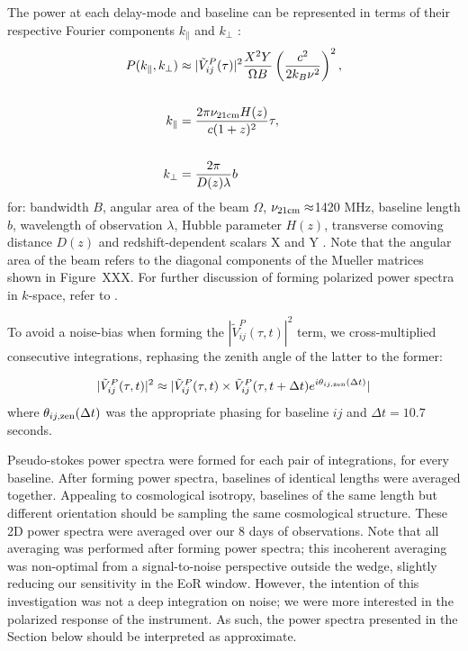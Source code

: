 The power at each delay-mode and baseline can be represented in terms of their respective Fourier components $k_{\parallel}$ and $k_{\perp}$ \citep{Parsons.12a, Nithya.15b}:
\begin{align*}
P(k_{\parallel},k_{\perp}) &\approx | \tilde{V}_{ij}^{P}(\tau) |^2 \frac{X^2 Y}{\Omega B} \left(\frac{c^2}{2k_B\nu^2}\right)^2 , \\\\
k_{\parallel} &= \frac{2\pi \nu_{\rm 21cm} H(z) %
}{c (1+z)^2}\tau, \\\\
k_{\perp} &= \frac{2\pi}{D(z) \lambda} b\\
\end{align*}
for: bandwidth $B$, angular area of the beam $\Omega$, $\nu_{\rm 21cm}\approx$1420 MHz, baseline length $b$, wavelength of observation $\lambda$, Hubble parameter $H(z)$, transverse comoving distance $D(z)$ and redshift-dependent scalars X and Y \citep{Parsons.12b}. Note that the angular area of the beam refers to the diagonal components of the Mueller matrices shown in Figure~XXX. For further discussion of forming polarized power spectra in $k$-space, refer to \cite{Nunhokee.17}.

To avoid a noise-bias when forming the $ |\tilde{V}_{ij}^{P}(\tau, t) |^2$ term, we cross-multiplied consecutive integrations, rephasing the zenith angle of the latter to the former:

\begin{equation}
 | \tilde{V}_{ij}^{P}(\tau, t) |^2 \approx | \tilde{V}_{ij}^{P}(\tau, t) \times \tilde{V}_{ij}^{P}(\tau, t+\Delta t)e^{i\theta_{ij,\rm zen}(\Delta t)}|
\end{equation}
where $\theta_{ij,\rm zen}(\Delta t)$ was the appropriate phasing for baseline $ij$ and $\Delta t = 10.7$ seconds.

Pseudo-stokes power spectra were formed for each pair of integrations, for every baseline. After forming power spectra, baselines of identical lengths were averaged together. Appealing to cosmological isotropy, baselines of the same length but different orientation should be sampling the same cosmological structure. These 2D power spectra were averaged over our 8 days of observations. Note that all averaging was performed after forming power spectra; this incoherent averaging was non-optimal from a signal-to-noise perspective outside the wedge, slightly reducing our sensitivity in the EoR window. However, the intention of this investigation was not a deep integration on noise; we were more interested in the polarized response of the instrument. As such, the power spectra presented in the Section below should be interpreted as approximate.

